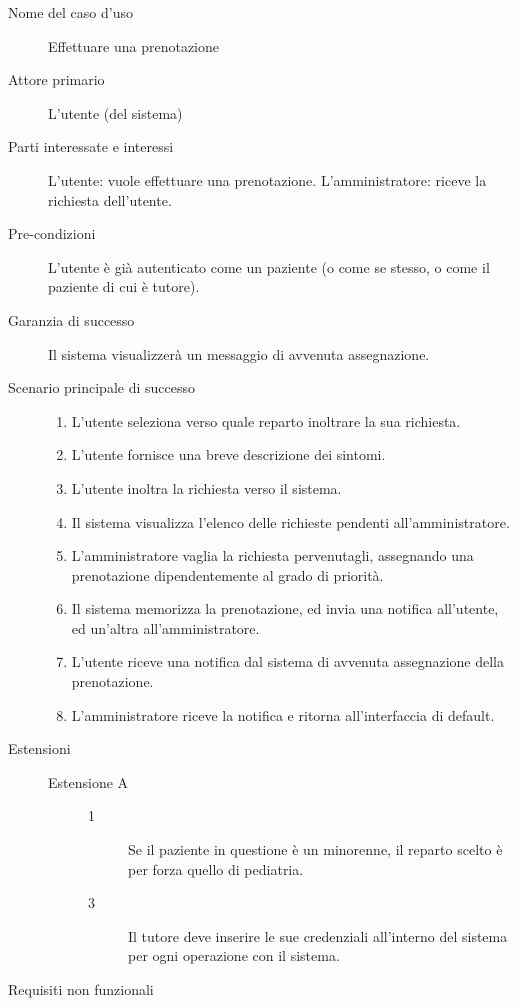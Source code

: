\begin{description}
\item[Nome del caso d'uso]
        Effettuare una prenotazione

\item[Attore primario]
        L'utente (del sistema)

\item[Parti interessate e interessi]
\begin{itemize}
\diam L'utente: vuole effettuare una prenotazione.
\diam L'amministratore: riceve la richiesta dell'utente.
\end{itemize}

\item[Pre-condizioni]
        L'utente è già autenticato come un paziente (o come se stesso, o come il 
        paziente di cui è tutore).

\item[Garanzia di successo]
        Il sistema visualizzerà un messaggio di avvenuta assegnazione.

\item[Scenario principale di successo]
\begin{enumerate}
\item L'utente seleziona verso quale reparto inoltrare la sua richiesta.
\item L'utente fornisce una breve descrizione dei sintomi.
\item L'utente inoltra la richiesta verso il sistema.
\item Il sistema visualizza l'elenco delle richieste pendenti all'amministratore.
\item L'amministratore vaglia la richiesta pervenutagli, assegnando una prenotazione
	dipendentemente al grado di priorità.
\item Il sistema memorizza la prenotazione, ed invia una notifica all'utente, ed
	un'altra all'amministratore.
\item L'utente riceve una notifica dal sistema di avvenuta assegnazione della
	prenotazione.
\item L'amministratore riceve la notifica e ritorna all'interfaccia di default.
\end{enumerate}

\item[Estensioni]
\begin{description}
	\item[Estensione A]
	\medskip
	
	\begin{description}
	\item[1]
	Se il paziente in questione è un minorenne, il reparto scelto è per forza 
	quello di pediatria.
	\item[3] Il tutore deve inserire le sue credenziali 
	all'interno del sistema per ogni operazione con il sistema.
	\end{description}
\end{description}
\item[Requisiti non funzionali] 
\begin{itemize}


\end{itemize}
\end{description}
